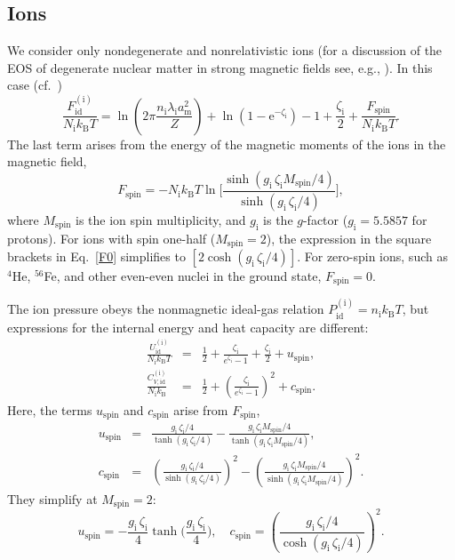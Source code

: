 \documentclass[traditabstract]{aa}
\newcommand{\beq}{\begin{equation}}
\newcommand{\eeq}{\end{equation}}
\newcommand{\bea}{\begin{eqnarray}}
\newcommand{\eea}{\end{eqnarray}}
\newcommand{\req}[1]{Eq.~\ref{#1}}
\newcommand{\am}{a_\mathrm{m}}
\newcommand{\gfact}{g_\mathrm{i}}
\newcommand{\lambdi}{\lambda_\mathrm{i}}
\newcommand{\Mspin}{M_\mathrm{spin}}
\newcommand{\nion}{n_\mathrm{i}}
\newcommand{\Nion}{N_\mathrm{i}}
\newcommand{\kB}{k_\mathrm{B}}
\newcommand{\zeti}{\zeta_\mathrm{i}}
\begin{document}
\subsection{Ions}

We consider only nondegenerate and nonrelativistic ions 
(for a discussion of the EOS of degenerate nuclear matter
in strong magnetic fields see, e.g., \citealp{Broderick,SuhMathews}).
In this case (cf.\ \citealp{PCS})
\beq
 \frac{F_\mathrm{id}^\mathrm{(i)}}{\Nion \kB T} =
      \ln\left(2\pi \frac{\nion \lambdi\am^2}{Z}\right)
    + \ln\left( 1- \mathrm{e}^{- \zeti}\right) -1 +
      \frac{\zeti}{2} + \frac{F_\mathrm{spin}}{\Nion \kB T} .
\label{Fp}
\eeq
The last term arises from the energy of the magnetic
moments of the ions in the magnetic field,
\beq
  F_\mathrm{spin} = - \Nion 
     \kB T \ln\Bigg[\frac{
     \sinh(\gfact\,\zeti \Mspin/4) }{ \sinh(\gfact\,\zeti/ 4)
       }
     \Bigg],
\label{F0}
\end{equation}
where $\Mspin$ is the ion spin multiplicity, 
and $\gfact$ is the $g$-factor
($\gfact=5.5857$ for
protons). 
For ions with spin one-half ($\Mspin=2$), the expression in
the square brackets in \req{F0} simplifies to
$[2\cosh(\gfact\,\zeti/ 4)]$.
For zero-spin ions, such as $^4$He,
$^{56}$Fe, and other even-even nuclei in the ground state,
$F_\mathrm{spin}=0$.

The ion pressure obeys the nonmagnetic 
ideal-gas relation $P_\mathrm{id}^\mathrm{(i)}=\nion\kB T$,
but expressions for the internal energy
and heat capacity are different:
\bea
   \frac{U_\mathrm{id}^\mathrm{(i)}}{\Nion \kB T} &=&
   \frac12 + \frac{\zeti}{e^{\zeti}-1} +
   \frac{\zeti}{2} + u_\mathrm{spin},
\\
   \frac{C_{V,\mathrm{id}}^\mathrm{(i)}}{\Nion \kB} &=&
      \frac12 + \left(\frac{\zeti}{e^{\zeti}-1}\right)^{\!2}
       + c_\mathrm{spin} .
\eea
Here, the terms $u_\mathrm{spin}$ and $c_\mathrm{spin}$ 
arise from $F_\mathrm{spin}$,
\bea
   u_\mathrm{spin} &=&
   \frac{\gfact\,\zeti/4}{\tanh(\gfact\,\zeti/4)}
    - \frac{\gfact\,\zeti \Mspin/4}{\tanh(\gfact\,\zeti \Mspin/4)},
\\
   c_{\mathrm{spin}} &=& \left(\frac{\gfact\,\zeti/4}{\sinh(\gfact\,\zeti /4)}\right)^{\!2} -
   \left(\frac{\gfact\,\zeti \Mspin/4}{\sinh(\gfact\,\zeti \Mspin/4)}\right)^{\!2} .
\eea 
They simplify at $\Mspin=2$:
\beq
   u_\mathrm{spin} =
    - \frac{\gfact\,\zeti}{4}\tanh\Bigg(\frac{\gfact\,\zeti}{4}\Bigg),
\quad
   c_{\mathrm{spin}} =
    \left(\frac{\gfact\,\zeti/4}{\cosh(\gfact\,\zeti /4)}\right)^{\!2} .
\eeq
\end{document}
